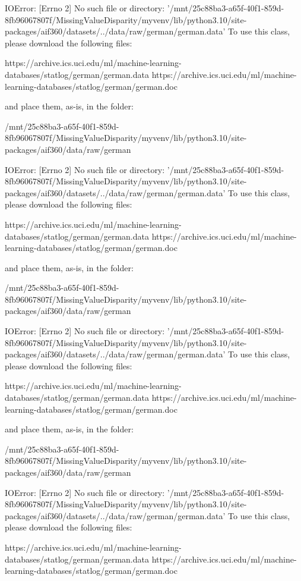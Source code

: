 IOError: [Errno 2] No such file or directory: '/mnt/25c88ba3-a65f-40f1-859d-8fb96067807f/MissingValueDisparity/myvenv/lib/python3.10/site-packages/aif360/datasets/../data/raw/german/german.data'
To use this class, please download the following files:

	https://archive.ics.uci.edu/ml/machine-learning-databases/statlog/german/german.data
	https://archive.ics.uci.edu/ml/machine-learning-databases/statlog/german/german.doc

and place them, as-is, in the folder:

	/mnt/25c88ba3-a65f-40f1-859d-8fb96067807f/MissingValueDisparity/myvenv/lib/python3.10/site-packages/aif360/data/raw/german

IOError: [Errno 2] No such file or directory: '/mnt/25c88ba3-a65f-40f1-859d-8fb96067807f/MissingValueDisparity/myvenv/lib/python3.10/site-packages/aif360/datasets/../data/raw/german/german.data'
To use this class, please download the following files:

	https://archive.ics.uci.edu/ml/machine-learning-databases/statlog/german/german.data
	https://archive.ics.uci.edu/ml/machine-learning-databases/statlog/german/german.doc

and place them, as-is, in the folder:

	/mnt/25c88ba3-a65f-40f1-859d-8fb96067807f/MissingValueDisparity/myvenv/lib/python3.10/site-packages/aif360/data/raw/german

IOError: [Errno 2] No such file or directory: '/mnt/25c88ba3-a65f-40f1-859d-8fb96067807f/MissingValueDisparity/myvenv/lib/python3.10/site-packages/aif360/datasets/../data/raw/german/german.data'
To use this class, please download the following files:

	https://archive.ics.uci.edu/ml/machine-learning-databases/statlog/german/german.data
	https://archive.ics.uci.edu/ml/machine-learning-databases/statlog/german/german.doc

and place them, as-is, in the folder:

	/mnt/25c88ba3-a65f-40f1-859d-8fb96067807f/MissingValueDisparity/myvenv/lib/python3.10/site-packages/aif360/data/raw/german

\midrule
{}IOError: [Errno 2] No such file or directory: '/mnt/25c88ba3-a65f-40f1-859d-8fb96067807f/MissingValueDisparity/myvenv/lib/python3.10/site-packages/aif360/datasets/../data/raw/german/german.data'
To use this class, please download the following files:

	https://archive.ics.uci.edu/ml/machine-learning-databases/statlog/german/german.data
	https://archive.ics.uci.edu/ml/machine-learning-databases/statlog/german/german.doc

